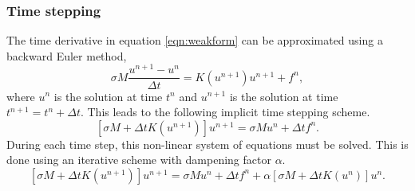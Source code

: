 \subsubsection{Time stepping}
The time derivative in equation \ref{eqn:weakform} can be approximated using a backward Euler method, 
\begin{equation}
    \sigma M\frac{u^{n+1} - u^n}{\Delta t} = K(u^{n+1}) u^{n+1} + f^{n},
\end{equation}
where $u^n$ is the solution at time $t^n$ and $u^{n+1}$ is the solution at time $t^{n+1} = t^n + \Delta t$.
This leads to the following implicit time stepping scheme.
\begin{equation}
    \left[\sigma M + \Delta t K(u^{n+1})\right]u^{n+1} = \sigma M u^n + \Delta t f^{n}.
\end{equation}
During each time step, this non-linear system of equations must be solved. This is done using an iterative scheme with dampening factor $\alpha$.
\begin{equation}
    \left[\sigma M + \Delta t K(u^{n+1})\right]u^{n+1} = \sigma M u^n + \Delta t f^{n} + \alpha \left[\sigma M + \Delta t K(u^{n})\right]u^{n}.
\end{equation}